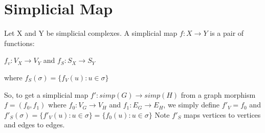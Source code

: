 \documentclass{article}
\begin{document}

\section{Simplicial Map}
\begin{definition}
Let X and Y be simplicial complexes. A simplicial map $f: X \rightarrow Y$ is a pair of functions:
\centerline {$f_v: V_X \rightarrow V_Y$ and $f_S: S_X \rightarrow S_Y$}

where $f_S(\sigma) = \{ f_V(u): u \in \sigma \}$
\end{definition}

So, to get a simplicial map $f': simp(G) \rightarrow simp(H)$ from a graph morphism $f= (f_0, f_1)$ where $f_0: V_G \rightarrow V_H$ and $f_1: E_G \rightarrow E_H$, we simply define $f'_V = f_0$ and $f'_S(\sigma) = \{ f'_V(u): u \in \sigma \} = \{ f_0(u): u \in \sigma \}$
Note $f'_S$ maps vertices to vertices and edges to edges.
\end{document}
